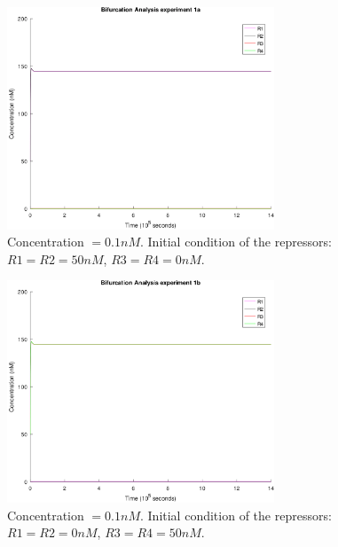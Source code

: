     \begin{figure}[!htbp]
      \centering
      \includegraphics[width=0.71\textwidth]{img/bifurcation-1a-1.png}
      \caption{Concentration $= 0.1nM$. Initial condition of the repressors: $R1 = R2 = 50nM$, $R3 = R4 = 0nM$.}
      \label{fig.bifurcation-1a}
    \end{figure}

    \begin{figure}[!htbp]
      \centering
      \includegraphics[width=0.71\textwidth]{img/bifurcation-1b-1.png}
      \caption{Concentration $= 0.1nM$. Initial condition of the repressors: $R1 = R2 = 0nM$, $R3 = R4 = 50nM$.}
      \label{fig.bifurcation-1b}
    \end{figure}

